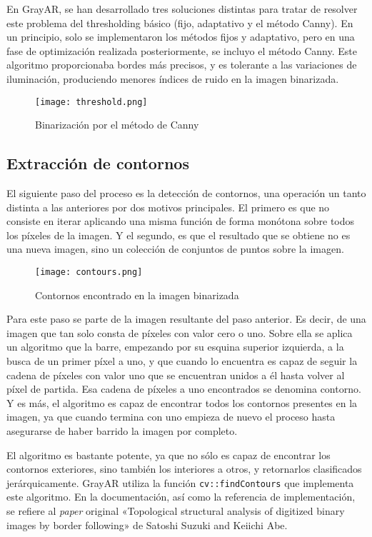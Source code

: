 En GrayAR, se han desarrollado tres soluciones distintas para tratar de resolver este problema del
thresholding básico (fijo, adaptativo y el método Canny). En un principio, solo se implementaron
los métodos fijos y adaptativo, pero en una fase de optimización realizada posteriormente, se incluyo
el método Canny. Este algoritmo proporcionaba bordes más precisos, y es  tolerante a las
variaciones de iluminación, produciendo menores índices de ruido en la imagen binarizada.

\begin{figure}[h] 
  \centering
  \texttt{[image: threshold.png]}
  \caption{Binarización por el método de Canny}
  \label{fig:binarizacion}
\end{figure}

\subsection{Extracción de contornos}
El siguiente paso del proceso es la detección de contornos, una operación un tanto distinta a las
anteriores por dos motivos principales. El primero es que no consiste en iterar aplicando una misma
función de forma monótona sobre todos los píxeles de la imagen. Y el segundo, es que el resultado que
se obtiene no es una nueva imagen, sino un colección de conjuntos de puntos sobre la imagen.

\begin{figure}[h] 
  \centering
  \texttt{[image: contours.png]}
  \caption{Contornos encontrado en la imagen binarizada}
  \label{fig:contours}
\end{figure}

Para este paso se parte de la imagen resultante del paso anterior. Es decir, de una imagen que tan
solo consta de píxeles con valor cero o uno. Sobre ella se aplica un algoritmo que la barre,
empezando por su esquina superior izquierda, a la busca de un primer píxel a uno, y que cuando lo
encuentra es capaz de seguir la cadena de píxeles con valor uno que se encuentran unidos a él hasta
volver al píxel de partida. Esa cadena de píxeles a uno encontrados se denomina contorno. Y es más,
el algoritmo es capaz de encontrar todos los contornos presentes en la imagen, ya que cuando termina
con uno empieza de nuevo el proceso hasta asegurarse de haber barrido la imagen por completo.

El algoritmo es bastante potente, ya que no sólo es capaz de encontrar los contornos exteriores,
sino también los interiores a otros, y retornarlos clasificados jerárquicamente. GrayAR utiliza la
función \texttt{cv::findContours} que implementa este algoritmo. En la documentación, así como la
referencia de implementación, se refiere al \textit{paper} original «Topological structural analysis
of digitized binary images by border following» de Satoshi Suzuki and Keiichi Abe.

